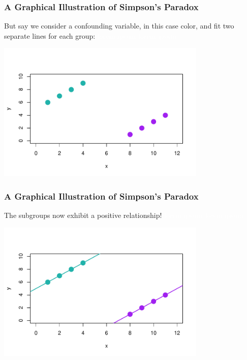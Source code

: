 \documentclass[handout]{beamer}
\newcommand{\blue}[1]{\textcolor{blue2}{#1}}
\begin{document}
\begin{frame}
\frametitle{A Graphical Illustration of Simpson's Paradox}
But say we consider a \blue{confounding} variable, in this case \blue{color}, and fit two separate lines for each group: \textcolor{white}{lorem ipsum lorem ipsum}
\begin{center}
\includegraphics[width=10cm]{figure/simpsons3.pdf}
\end{center}

\end{frame}



\begin{frame}
\frametitle{A Graphical Illustration of Simpson's Paradox}
The subgroups now exhibit a \blue{positive} relationship! \textcolor{white}{lorem ipsum lorem ipsum}
\begin{center}
\includegraphics[width=10cm]{figure/simpsons4.pdf}
\end{center}

\end{frame}
\end{document}
